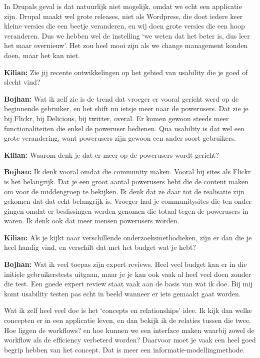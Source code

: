 In Drupals geval is dat natuurlijk niet mogelijk, omdat we echt een applicatie zijn. Drupal maakt wel grote releases, niet als Wordpress, die doet iedere keer kleine versies die een beetje veranderen, en wij doen grote versies die een hoop veranderen. Dus we hebben wel de instelling `we weten dat het beter is, dus leer het maar overnieuw'. Het zou heel mooi zijn als we change management konden doen, maar het kan niet.

\textbf{Kilian:} Zie jij recente ontwikkelingen op het gebied van usability die je goed of slecht vind?

\textbf{Bojhan:} Wat ik zelf zie is de trend dat vroeger er vooral gericht werd op de beginnende gebruiker, en het shift nu ietsje meer naar de powerusers. Dat zie je bij Flickr, bij Delicious, bij twitter, overal. Er komen gewoon steeds meer functionaliteiten die enkel de poweruser bedienen. Qua usability is dat wel een grote verandering, want powerusers zijn gewoon een ander soort gebruikers.

\textbf{Kilian:} Waarom denk je dat er meer op de powerusers wordt gericht?

\textbf{Bojhan:} Ik denk vooral omdat die community maken. Vooral bij sites als Flickr is het belangrijk. Dat je een groot aantal powerusers hebt die de content maken om voor de middengroep te bekijken. Ik denk dat ze daar tot de realisatie zijn gekomen dat dat echt belangrijk is. Vroeger had je communitysites die ten onder gingen omdat er beslissingen werden genomen die totaal tegen de powerusers in waren. Ik denk ook dat meer mensen powerusers worden.

\textbf{Kilian:} Als je kijkt naar verschillende onderzoeksmethodieken, zijn er dan die je heel handig vind, en verschilt dat met het budget wat je hebt?

\textbf{Bojhan:}  Wat ik veel toepas zijn expert reviews. Heel veel budget kan er in die initiele gebruikerstests uitgaan, maar je je kan ook vaak al heel veel doen zonder die test. Een goede expert review staat vaak aan de basis van wat ik doe. Bij mij komt usability testen pas echt in beeld wanneer er iets gemaakt gaat worden.

Wat ik zelf heel veel doe is het `concepts en relationships' idee. Ik kijk dan welke concepten er in een applicatie leven, en dan bekijk ik de relaties tussen die twee. Hoe liggen de workflows? en hoe kunnen we een interface maken waarbij zowel de workflow als de efficiency verbeterd worden? Daarvoor moet je vaak een heel goed begrip hebben van het concept. Dat is meer een informatie-modellingmethode.

